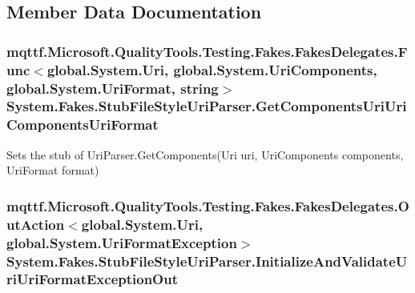 \subsection{Member Data Documentation}
\hypertarget{class_system_1_1_fakes_1_1_stub_file_style_uri_parser_aa69713af08f1c578063cd33fc8213929}{
\subsubsection[{Get\-Components\-Uri\-Uri\-Components\-Uri\-Format}]{\setlength{\rightskip}{0pt plus 5cm}mqttf.\-Microsoft.\-Quality\-Tools.\-Testing.\-Fakes.\-Fakes\-Delegates.\-Func$<$global.\-System.\-Uri, global.\-System.\-Uri\-Components, global.\-System.\-Uri\-Format, string$>$ System.\-Fakes.\-Stub\-File\-Style\-Uri\-Parser.\-Get\-Components\-Uri\-Uri\-Components\-Uri\-Format}}\label{class_system_1_1_fakes_1_1_stub_file_style_uri_parser_aa69713af08f1c578063cd33fc8213929}


Sets the stub of Uri\-Parser.\-Get\-Components(\-Uri uri, Uri\-Components components, Uri\-Format format)

\hypertarget{class_system_1_1_fakes_1_1_stub_file_style_uri_parser_aa8ae5a29d5c90a8032f3ff6ba55a3540}{
\subsubsection[{Initialize\-And\-Validate\-Uri\-Uri\-Format\-Exception\-Out}]{\setlength{\rightskip}{0pt plus 5cm}mqttf.\-Microsoft.\-Quality\-Tools.\-Testing.\-Fakes.\-Fakes\-Delegates.\-Out\-Action$<$global.\-System.\-Uri, global.\-System.\-Uri\-Format\-Exception$>$ System.\-Fakes.\-Stub\-File\-Style\-Uri\-Parser.\-Initialize\-And\-Validate\-Uri\-Uri\-Format\-Exception\-Out}}\label{class_system_1_1_fakes_1_1_stub_file_style_uri_parser_aa8ae5a29d5c90a8032f3ff6ba55a3540}


